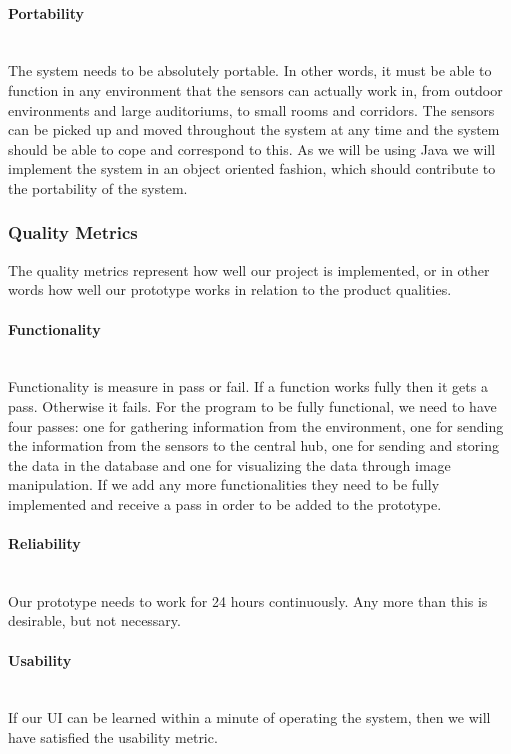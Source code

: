 \documentclass[../document.tex]{subfiles}
\begin{document}
\paragraph{Portability} \ \\
The system needs to be absolutely portable. In other words, it must be able to function in any environment that the sensors can actually work in, from outdoor environments and large auditoriums, to small rooms and corridors. The sensors can be picked up and moved throughout the system at any time and the system should be able to cope and correspond to this. As we will be using Java we will implement the system in an object oriented fashion, which should contribute to the portability of the system.

\subsubsection{Quality Metrics}
The quality metrics represent how well our project is implemented, or in other words how well our prototype works in relation to the product qualities.

\paragraph{Functionality} \ \\
Functionality is measure in pass or fail. If a function works fully then it gets a pass. Otherwise it fails. For the program to be fully functional, we need to have four passes: one for gathering information from the environment, one for sending the information from the sensors to the central hub, one for sending and storing the data in the database and one for visualizing the data through image manipulation. If we add any more functionalities they need to be fully implemented and receive a pass in order to be added to the prototype.

\paragraph{Reliability} \ \\
Our prototype needs to work for 24 hours continuously. Any more than this is desirable, but not necessary.

\paragraph{Usability} \ \\
If our UI can be learned within a minute of operating the system, then we will have satisfied the usability metric.
\end{document}
